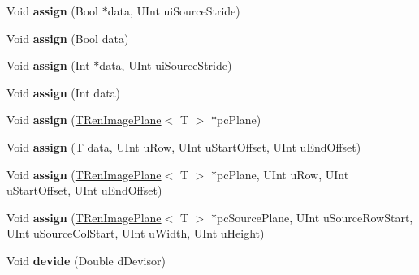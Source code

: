 \begin{DoxyCompactItemize}
\item 
\mbox{\label{class_t_ren_image_plane_ac09b512d263e7b08774e0b7d88fd1ba5}} 
Void {\bfseries assign} (Bool $\ast$data, U\+Int ui\+Source\+Stride)
\item 
\mbox{\label{class_t_ren_image_plane_a4a28858ec1dfc54c362bedca85f58243}} 
Void {\bfseries assign} (Bool data)
\item 
\mbox{\label{class_t_ren_image_plane_a999321aa7fd7f0ddedd53307b4ce87ac}} 
Void {\bfseries assign} (Int $\ast$data, U\+Int ui\+Source\+Stride)
\item 
\mbox{\label{class_t_ren_image_plane_ab84ff21fcf31c839cf427ea350da521c}} 
Void {\bfseries assign} (Int data)
\item 
\mbox{\label{class_t_ren_image_plane_a1788218070f7c719abdd92c343e1281f}} 
Void {\bfseries assign} (\hyperlink{class_t_ren_image_plane}{T\+Ren\+Image\+Plane}$<$ T $>$ $\ast$pc\+Plane)
\item 
\mbox{\label{class_t_ren_image_plane_a223fa3be3b9627c8fe61994b575d8d50}} 
Void {\bfseries assign} (T data, U\+Int u\+Row, U\+Int u\+Start\+Offset, U\+Int u\+End\+Offset)
\item 
\mbox{\label{class_t_ren_image_plane_ab12e6fe83b4bb7ba2fea4f4dc004ad15}} 
Void {\bfseries assign} (\hyperlink{class_t_ren_image_plane}{T\+Ren\+Image\+Plane}$<$ T $>$ $\ast$pc\+Plane, U\+Int u\+Row, U\+Int u\+Start\+Offset, U\+Int u\+End\+Offset)
\item 
\mbox{\label{class_t_ren_image_plane_ab19b4dc4d86a3e3bb4668a2d3791bdde}} 
Void {\bfseries assign} (\hyperlink{class_t_ren_image_plane}{T\+Ren\+Image\+Plane}$<$ T $>$ $\ast$pc\+Source\+Plane, U\+Int u\+Source\+Row\+Start, U\+Int u\+Source\+Col\+Start, U\+Int u\+Width, U\+Int u\+Height)
\item 
\mbox{\label{class_t_ren_image_plane_a4d1d37dc324cd11046fda83b3d650654}} 
Void {\bfseries devide} (Double d\+Devisor)
\item 

\end{DoxyCompactItemize}
